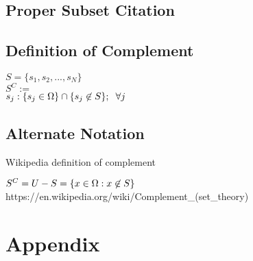 \documentclass[11pt]{article}
\begin{document}
\subsection{Proper Subset Citation}




\subsection{Definition of Complement}
\begin{center}
$
S = \{ s_1,s_2,...,s_N \}
$
\\
$
S^C :=
$
\\
$
s_j: \{ s_j \in \Omega\} \cap \{s_j \not \in S\}; \hspace{2mm} \forall j
$
\end{center}
\subsection{Alternate Notation}
Wikipedia definition of complement
\begin{center}
$
S^C = U - S = \{x \in \Omega : x \not \in S\} \hspace{3mm} 
$
https://en.wikipedia.org/wiki/Complement\_(set\_theory)
\end{center}




\newpage
\section*{Appendix}
\end{document}
